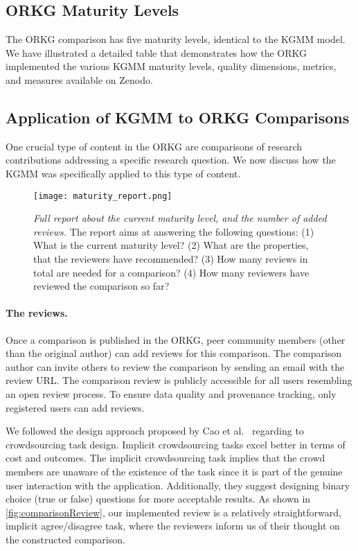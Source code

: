 \documentclass[runningheads]{llncs}
\begin{document}
\subsection{ORKG Maturity Levels}
The ORKG comparison has five maturity levels, identical to the KGMM model. 
   We have illustrated a detailed table that demonstrates how the ORKG implemented the various KGMM maturity levels, quality dimensions, metrics, and measures available on Zenodo. \cite{hussein_hassan_2022_6732786}
\subsection{Application of KGMM to ORKG Comparisons}

One crucial type of content in the ORKG are comparisons of research contributions addressing a specific research question. 
We now discuss how the KGMM was specifically applied to this type of content.

\begin{figure}
\centering
\texttt{[image: maturity\_report.png]}
\caption{\textit{Full report about the current maturity level, and the number of added reviews.} The report aims at answering the following questions:
(1) What is the current maturity level?
(2) What are the properties, that the reviewers have recommended?
(3) How many reviews in total are needed for a comparison?
(4) How many reviewers have reviewed the comparison so far?
}
\label{fig:maturityReport}
\end{figure}

\vspace{-.2cm}
\paragraph{The reviews.} Once a comparison is published in the ORKG, peer community members (other than the original author) can add reviews for this comparison.
The comparison author can invite others to review the comparison by sending an email with the review URL.
The comparison review is publicly accessible for all users resembling an open review process. 
To ensure data quality and provenance tracking, only registered users can add reviews.

We followed the design approach proposed by Cao et al.~\cite{qi_knowledge_2021} regarding to crowdsourcing task design.
Implicit crowdsourcing tasks excel better in terms of cost and outcomes.
The implicit crowdsourcing task implies that the crowd members are unaware of the existence of the task since it is part of the genuine user interaction with the application.
Additionally, they suggest designing binary choice (true or false) questions for more acceptable results.
As shown in \autoref{fig:comparisonReview}, our implemented review is a relatively straightforward, implicit agree/disagree task, where the reviewers inform us of their thought on the constructed comparison.
\end{document}
